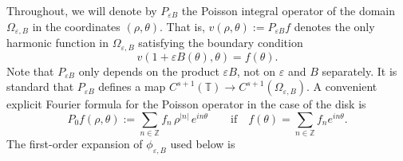 \documentclass[12pt,reqno]{amsart}
\numberwithin{equation}{section}
\theoremstyle{definition}
\theoremstyle{remark}
\begin{document}
Throughout, we will denote by $ P_{\varepsilon B}$ the Poisson integral operator of the domain $\varOmega_{\varepsilon, B}$ in the coordinates $(\rho,\theta)$.
That is, $v(\rho,\theta) := P_{\varepsilon B} f$ denotes the only harmonic function in $\varOmega_{\varepsilon, B}$ satisfying the boundary condition
\[
v(1+\varepsilon B(\theta),\theta) = f(\theta) .
\]
Note that $P_{\varepsilon B}$ only depends on the product $\varepsilon B$, not on $\varepsilon$ and $B$ separately.
It is standard that $P_{\varepsilon B}$ defines a map $C^{s+1}(\mathbb{T}) \to C^{s+1}(\varOmega_{\varepsilon, B})$.
A convenient explicit Fourier formula for the Poisson operator in the case of the disk is
\[
P_0 f(\rho,\theta) := \sum_{n\in\mathbb{Z}} f_n \,\rho^{|n|}\, e^{in\theta}
\qquad\text{if}\quad f(\theta) = \sum_{n\in\mathbb{Z}} f_n e^{in\theta} .
\]
The first-order expansion of $ \phi_{\varepsilon,B} $ used below is
\end{document}
